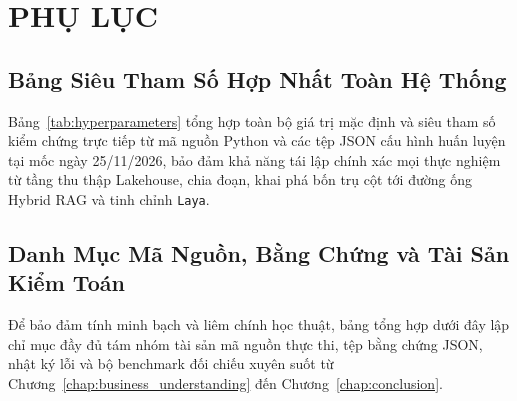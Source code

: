 
\chapter*{PHỤ LỤC}
\renewcommand{\thesection}{\Alph{section}}
\renewcommand{\theHsection}{appendix.\Alph{section}}
\setcounter{section}{0}
\renewcommand{\theHfigure}{appendix.\thesection.\arabic{figure}}

\section{Bảng Siêu Tham Số Hợp Nhất Toàn Hệ Thống}
\label{sec:appendix_hyperparams}

Bảng~\ref{tab:hyperparameters} tổng hợp toàn bộ giá trị mặc định và siêu tham số kiểm chứng trực tiếp từ mã nguồn Python và các tệp JSON cấu hình huấn luyện tại mốc ngày 25/11/2026, bảo đảm khả năng tái lập chính xác mọi thực nghiệm từ tầng thu thập Lakehouse, chia đoạn, khai phá bốn trụ cột tới đường ống Hybrid RAG và tinh chỉnh \texttt{Laya}.



\FloatBarrier
\section{Danh Mục Mã Nguồn, Bằng Chứng và Tài Sản Kiểm Toán}
\label{sec:appendix_inventory}

Để bảo đảm tính minh bạch và liêm chính học thuật, bảng tổng hợp dưới đây lập chỉ mục đầy đủ tám nhóm tài sản mã nguồn thực thi, tệp bằng chứng JSON, nhật ký lỗi và bộ benchmark đối chiếu xuyên suốt từ Chương~\ref{chap:business_understanding} đến Chương~\ref{chap:conclusion}.

